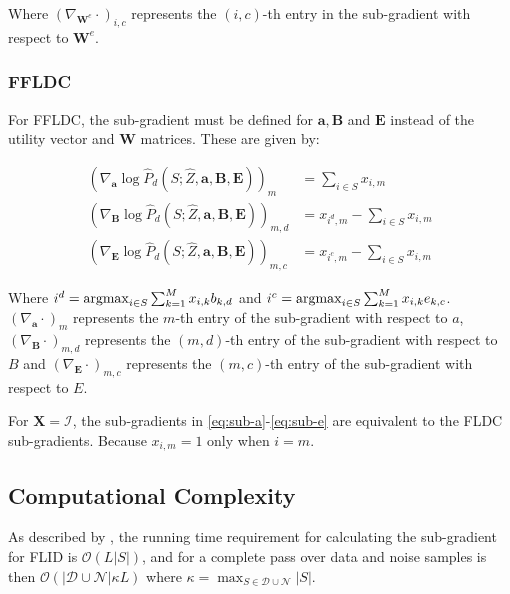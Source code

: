 Where $\left(\nabla_{\mathbf{W}^{e}}\cdot \right)_{i,c}$ represents the $(i,c)$-th entry in the sub-gradient with respect to $\mathbf{W}^{e}$.

\subsubsection{FFLDC}

For FFLDC, the sub-gradient must be defined for $\mathbf{a}, \mathbf{B}$ and $\mathbf{E}$ instead of the utility vector and $\mathbf{W}$ matrices. These are given by:

\begin{align}
  \left(\nabla_{\mathbf{a}}\log{\hat{P}_{d}(S; \hat{Z}, \mathbf{a}, \mathbf{B}, \mathbf{E})}\right)_{m} &= \sum_{i \in S} x_{i,m} \label{eq:sub-a}\\
  \left(\nabla_{\mathbf{B}}\log{\hat{P}_{d}(S; \hat{Z}, \mathbf{a}, \mathbf{B}, \mathbf{E})}\right)_{m,d} &= x_{i^{d},m} - \sum_{i \in S} x_{i,m} \label{eq:sub-b} \\
  \left(\nabla_{\mathbf{E}}\log{\hat{P}_{d}(S; \hat{Z}, \mathbf{a}, \mathbf{B}, \mathbf{E})}\right)_{m,c} &= x_{i^{c},m} - \sum_{i \in S} x_{i,m} \label{eq:sub-e}
\end{align}

Where $i^{d} = \operatorname*{argmax}_{i \in S}{\sum_{k=1}^{M}{x_{i,k}b_{k,d}}}$ and $i^{c} = \operatorname*{argmax}_{i \in S}{\sum_{k=1}^{M}x_{i,k}e_{k,c}}$. $\left(\nabla_{\mathbf{a}}\cdot \right)_{m}$ represents the $m$-th entry of the sub-gradient with respect to $a$, $\left(\nabla_{\mathbf{B}}\cdot\right)_{m,d}$ represents the $(m,d)$-th entry of the sub-gradient with respect to $B$ and $\left(\nabla_{\mathbf{E}}\cdot\right)_{m,c}$ represents the $(m,c)$-th entry of the sub-gradient with respect to $E$.

\begin{remark}
  For $\mathbf{X} = \mathcal{I}$, the sub-gradients in \ref{eq:sub-a}-\ref{eq:sub-e} are equivalent to the FLDC sub-gradients. Because $x_{i,m} = 1$ only when $i = m$.
\end{remark}

\subsection{Computational Complexity}

As described by \citet{tschiatschek16learning}, the running time requirement for calculating the sub-gradient for FLID is $\mathcal{O}(L|S|)$, and for a complete pass over data and noise samples is then $\mathcal{O}(|\mathcal{D}\cup\mathcal{N}|\kappa L)$ where $\kappa = \max_{S \in \mathcal{D}\cup\mathcal{N}}{|S|}$.

